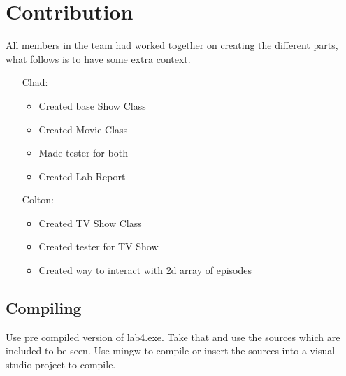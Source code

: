 \documentclass[10pt]{article}
\begin{document}
	\section{Contribution}
	All members in the team had worked together on creating the different parts, what follows is to have some extra context.
	\begin{itemize}
		\item [Chad:]
		\begin{itemize}
			\item Created base Show Class
			\item Created Movie Class
			\item Made tester for both
			\item Created Lab Report
		\end{itemize}
		\item[Colton:]
		\begin{itemize}
			\item Created TV Show Class
			\item Created tester for TV Show
			\item Created way to interact with 2d array of episodes
		\end{itemize}
	\end{itemize}
	\subsection{Compiling}
	Use pre compiled version of lab4.exe. Take that and use the sources which are included to be seen. Use mingw to compile or insert the sources into a visual studio project to compile.
\end{document}
